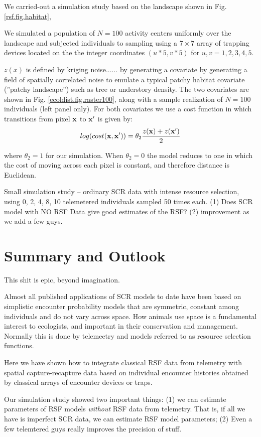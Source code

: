 We carried-out a simulation study based on the landscape
shown in  Fig. \ref{rsf.fig.habitat},

We simulated a population of $N=100$ activity centers uniformly over
the landscape and subjected individuals to sampling using 
a $7 \times 7$ array of trapping devices located on the 
the integer coordinates 
$(u*5,v*5)$ for $u,v = 1,2,3,4,5$.

 $z(x)$ is defined by kriging noise......
by generating a covariate by generating a field of spatially correlated noise to
emulate a typical patchy habitat covariate (''patchy landscape'') such as
tree or understory density. The two covariates are shown in
Fig. \ref{ecoldist.fig.raster100}, along with a sample realization of
$N=100$ individuals (left panel only).  For both covariates we use a
cost function in which transitions from pixel ${\bf x}$ to ${\bf x}'$
is given by:
\[
 log(cost({\bf x},{\bf x}'))=  \theta_2 \frac{z({\bf x}) + z({\bf x}')}{2}
\]

{\flushleft where} $\theta_2 = 1$ for our simulation.
When $\theta_2=0$ the
model reduces to one in which the cost of moving across each pixel is
constant, and therefore distance is Euclidean.

Small simulation study -- ordinary SCR data with intense resource selection,
using 0, 2, 4, 8, 10 telemetered individuals sampled 50 times each. 
(1) Does SCR model with NO RSF Data give good estimates of the RSF?
(2) improvement as we add a few guys. 


\section{Summary and Outlook}

This shit is epic, beyond imagination.

Almost 
all published applications of SCR models to date have been based on
simplistic encounter probability models that are symmetric, constant among
individuals and  do not vary across space. How animals use space is a
fundamental interest to ecologists, and important in their
conservation and management. Normally this is done by telemeetry and
models referred to as resource selection functions. 

Here we have shown how to integrate classical RSF data from telemetry
with spatial capture-recapture data based on individual encounter
histories obtained by classical arrays of encounter devices or traps. 

Our simulation study showed two important things:
(1) we can estimate parameters of RSF models {\it without} RSF data
from telemetry. That is, if all we have is imperfect SCR data, we can
estimate RSF model parameters;
(2) Even a few telemtered guys really
improves the precision of stuff.

